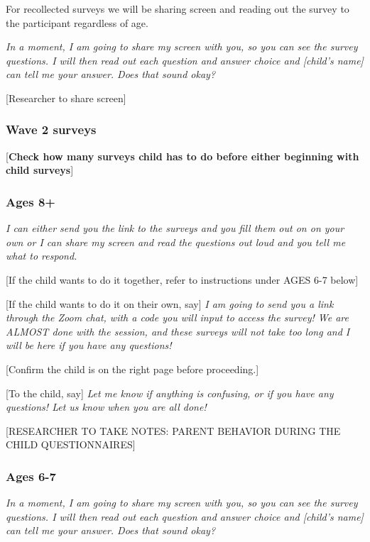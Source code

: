 \documentclass[]{book}
\begin{document}
For recollected surveys we will be sharing screen and reading out the survey to the participant regardless of age.

\emph{In a moment, I am going to share my screen with you, so you can see the survey questions. I will then read out each question and answer choice and {[}child's name{]} can tell me your answer. Does that sound okay? }

{[}Researcher to share screen{]}

\hypertarget{wave-2-surveys}{%
\subsubsection{Wave 2 surveys}\label{wave-2-surveys}}

{[}\textbf{Check how many surveys child has to do before either beginning with child surveys}{]}

\hypertarget{ages-8-1}{%
\subsubsection{Ages 8+}\label{ages-8-1}}

\emph{I can either send you the link to the surveys and you fill them out on on your own or I can share my screen and read the questions out loud and you tell me what to respond.}

{[}If the child wants to do it together, refer to instructions under AGES 6-7 below{]}

{[}If the child wants to do it on their own, say{]} \emph{I am going to send you a link through the Zoom chat, with a code you will input to access the survey! We are ALMOST done with the session, and these surveys will not take too long and I will be here if you have any questions! }

{[}Confirm the child is on the right page before proceeding.{]}

{[}To the child, say{]} \emph{Let me know if anything is confusing, or if you have any questions! Let us know when you are all done!}

{[}RESEARCHER TO TAKE NOTES: PARENT BEHAVIOR DURING THE CHILD QUESTIONNAIRES{]}

\hypertarget{ages-6-7-1}{%
\subsubsection{Ages 6-7}\label{ages-6-7-1}}

\emph{In a moment, I am going to share my screen with you, so you can see the survey questions. I will then read out each question and answer choice and {[}child's name{]} can tell me your answer. Does that sound okay? }
\end{document}
